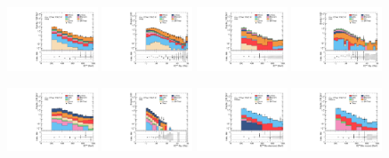\begin{figure}

    \centering

    \includegraphics[width=0.24\textwidth]{images/analysis_EWK/v192_2_nosyst/can_VRW_met_et_afterFit.pdf}
    \includegraphics[width=0.24\textwidth]{images/analysis_EWK/v192_2_nosyst/can_VRW_met_sig_obj_afterFit.pdf}
    \includegraphics[width=0.24\textwidth]{images/analysis_EWK/v192_2_nosyst/can_VRT_met_et_afterFit.pdf}
    \includegraphics[width=0.24\textwidth]{images/analysis_EWK/v192_2_nosyst/can_VRT_met_sig_obj_afterFit.pdf}

    \includegraphics[width=0.24\textwidth]{images/analysis_EWK/v192_2_nosyst/can_VRE_met_et_afterFit.pdf}
    \includegraphics[width=0.24\textwidth]{images/analysis_EWK/v192_2_nosyst/can_VRE_met_sig_obj_afterFit.pdf}
    \includegraphics[width=0.24\textwidth]{images/analysis_EWK/v192_2_nosyst/can_VRZee_met_noele_et_afterFit.pdf}
    \includegraphics[width=0.24\textwidth]{images/analysis_EWK/v192_2_nosyst/can_VRZmm_met_nomuon_et_afterFit.pdf}


\end{figure}
